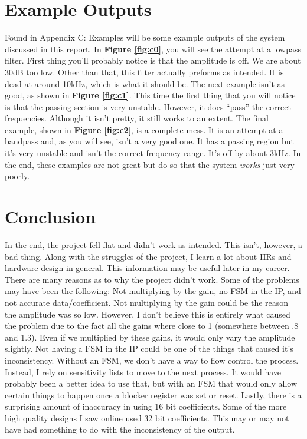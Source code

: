 \documentclass[12pt,a4paper,titlepage]{article}
\begin{document}
\section{Example Outputs}
Found in Appendix C: Examples will be some example outputs of the system
discussed in this report. In \textbf{Figure \ref{fig:c0}}, you will see the
attempt at a lowpass filter. First thing you'll probably notice is that the
amplitude is off. We are about 30dB too low. Other than that, this filter
actually preforms as intended. It is dead at around 10kHz, which is what it
should be. The next example isn't as good, as shown in \textbf{Figure
  \ref{fig:c1}}. This time the first thing that you will notice is that the
passing section is very unstable. However, it does ``pass'' the correct
frequencies. Although it isn't pretty, it still works to an extent. The final
example, shown in \textbf{Figure \ref{fig:c2}}, is a complete mess. It is an
attempt at a bandpass and, as you will see, isn't a very good one. It has a
passing region but it's very unstable and isn't the correct frequency
range. It's off by about 3kHz. In the end, these examples are not great but do
so that the system \emph{works} just very poorly.

\section{Conclusion}
In the end, the project fell flat and didn't work as intended. This isn't,
however, a bad thing. Along with the struggles of the project, I learn a lot
about IIRs and hardware design in general. This information may be useful later
in my career. There are many reasons as to why the project didn't work. Some of
the problems may have been the following: Not multiplying by the gain, no FSM in
the IP, and not accurate data/coefficient. Not multiplying by the gain could be
the reason the amplitude was so low. However, I don't believe this is entirely
what caused the problem due to the fact all the gains where close to 1
(somewhere between .8 and 1.3). Even if we multiplied by these gains, it would
only vary the amplitude slightly. Not having a FSM in the IP could be one of the
things that caused it's inconsistency. Without an FSM, we don't have a way to
flow control the process. Instead, I rely on sensitivity lists to move to the
next process. It would have probably been a better idea to use that, but with an
FSM that would only allow certain things to happen once a blocker register was
set or reset. Lastly, there is a surprising amount of inaccuracy in using 16 bit
coefficients. Some of the more high quality designs I saw online used 32 bit
coefficients. This may or may not have had something to do with the
inconsistency of the output.
\end{document}
